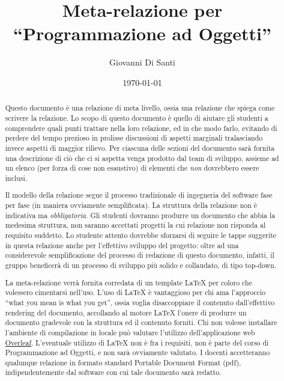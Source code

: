 \documentclass[a4paper,12pt]{report}
\title{Meta-relazione per\\``Programmazione ad Oggetti''}
\author{Giovanni Di Santi}
\date{\today}
\begin{document}
 
\maketitle

\begin{abstract}
Questo documento è una relazione di meta livello, ossia una relazione che spiega come scrivere la relazione.
%
Lo scopo di questo documento è quello di aiutare gli studenti a comprendere quali punti trattare nella loro relazione, ed in che modo farlo, evitando di perdere del tempo prezioso in prolisse discussioni di aspetti marginali tralasciando invece aspetti di maggior rilievo.
%
Per ciascuna delle sezioni del documento sarà fornita una descrizione di ciò che ci si aspetta venga prodotto dal team di sviluppo, assieme ad un elenco (per forza di cose non esaustivo) di elementi che \emph{non} dovrebbero essere inclusi.

Il modello della relazione segue il processo tradizionale di ingegneria del software fase per fase (in maniera ovviamente semplificata).
%
La struttura della relazione non è indicativa ma \textit{obbligatoria}.
%
Gli studenti dovranno produrre un documento che abbia la medesima struttura, non saranno accettati progetti la cui relazione non risponda al requisito suddetto.
%
Lo studente attento dovrebbe sforzarsi di seguire le tappe suggerite in questa relazione anche per l'effettivo sviluppo del progetto: oltre ad una considerevole semplificazione del processo di redazione di questo documento, infatti, il gruppo beneficerà di un processo di sviluppo più solido e collaudato, di tipo top-down.

La meta-relazione verrà fornita corredata di un template \LaTeX{} per coloro che volessero cimentarsi nell'uso.
%
L'uso di \LaTeX{} è vantaggioso per chi ama l'approccio ``what you mean is what you get'', ossia voglia disaccoppiare il contenuto dall'effettivo rendering del documento, accollando al motore \LaTeX{} l'onere di produrre un documento gradevole con la struttura ed il contenuto forniti.
%
Chi non volesse installare l'ambiente di compilazione in locale può valutare l'utilizzo dell'applicazione web \href{https://www.overleaf.com/}{Overleaf}.
%
L'eventuale utilizzo di \LaTeX{} non è fra i requisiti, non è parte del corso di Programmazione ad Oggetti, e non sarà ovviamente valutato. I docenti accetteranno qualunque relazione in formato standard Portable Document Format (pdf), indipendentemente dal software con cui tale documento sarà redatto.
\end{abstract}
\end{document}
